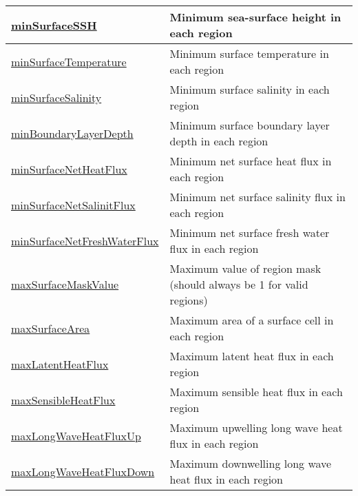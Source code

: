 {\begin{center}
\begin{longtable}{| p{2.0in} | p{4.0in} |}
    \hyperref[subsec:var_sec_surfaceAreaWeightedAveragesAM_minSurfaceSSH]{minSurfaceSSH} & Minimum sea-surface height in each region \\
    \hline
    \hyperref[subsec:var_sec_surfaceAreaWeightedAveragesAM_minSurfaceTemperature]{minSurfaceTemperature} & Minimum surface temperature in each region \\
    \hline
    \hyperref[subsec:var_sec_surfaceAreaWeightedAveragesAM_minSurfaceSalinity]{minSurfaceSalinity} & Minimum surface salinity in each region \\
    \hline
    \hyperref[subsec:var_sec_surfaceAreaWeightedAveragesAM_minBoundaryLayerDepth]{minBoundaryLayerDepth} & Minimum surface boundary layer depth in each region \\
    \hline
    \hyperref[subsec:var_sec_surfaceAreaWeightedAveragesAM_minSurfaceNetHeatFlux]{minSurfaceNetHeatFlux} & Minimum net surface heat flux in each region \\
    \hline
    \hyperref[subsec:var_sec_surfaceAreaWeightedAveragesAM_minSurfaceNetSalinitFlux]{minSurfaceNetSalinitFlux} & Minimum net surface salinity flux in each region \\
    \hline
    \hyperref[subsec:var_sec_surfaceAreaWeightedAveragesAM_minSurfaceNetFreshWaterFlux]{minSurfaceNetFreshWaterFlux} & Minimum net surface fresh water flux in each region \\
    \hline
    \hyperref[subsec:var_sec_surfaceAreaWeightedAveragesAM_maxSurfaceMaskValue]{maxSurfaceMaskValue} & Maximum value of region mask (should always be 1 for valid regions) \\
    \hline
    \hyperref[subsec:var_sec_surfaceAreaWeightedAveragesAM_maxSurfaceArea]{maxSurfaceArea} & Maximum area of a surface cell in each region \\
    \hline
    \hyperref[subsec:var_sec_surfaceAreaWeightedAveragesAM_maxLatentHeatFlux]{maxLatentHeatFlux} & Maximum latent heat flux in each region \\
    \hline
    \hyperref[subsec:var_sec_surfaceAreaWeightedAveragesAM_maxSensibleHeatFlux]{maxSensibleHeatFlux} & Maximum sensible heat flux in each region \\
    \hline
    \hyperref[subsec:var_sec_surfaceAreaWeightedAveragesAM_maxLongWaveHeatFluxUp]{maxLongWaveHeatFluxUp} & Maximum upwelling long wave heat flux in each region \\
    \hline
    \hyperref[subsec:var_sec_surfaceAreaWeightedAveragesAM_maxLongWaveHeatFluxDown]{maxLongWaveHeatFluxDown} & Maximum downwelling long wave heat flux in each region \\

\end{longtable}
\end{center}}
